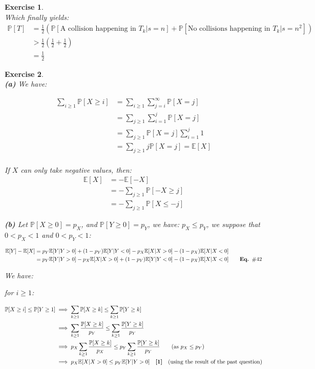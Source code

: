 \documentclass{article}
\newtheorem{exo}{Exercise}
\def\P{\mathbb{P}}
\def\E{\mathbb{E}}
\begin{document}
\begin{exo}{\ \\}
Which finally yields:
\begin{align*}
    \P[T] 
    &= \frac{1}{2} (\P[\text{A collision happening in $T_k$}|s=n] 
    + \P[\text{No collisions happening in $T_k$}|s=n^2]) \\
    &> \frac{1}{2}(\frac{1}{2} + \frac{1}{2} ) \\
    &= \frac{1}{2}
\end{align*}

\newpage
\end{exo}

\begin{exo}{\ \\}
\noindent    
\textbf{(a)} We have:

\begin{align*}
    \sum_{i\geq1} \P[X \geq i]
    &= \sum_{i\geq1} \sum_{j = i }^{\infty} \P[X=j] \\
    &= \sum_{j\geq1} \sum_{i=1}^{j} \P[X=j] \\
    &= \sum_{j\geq1} \P[X=j]\sum_{i=1}^{j}1  \\
    &= \sum_{j\geq1} j \P[X=j] = \E[X]\\
\end{align*}

If $X$ can only take negative values, then: 
\begin{align*}
    \E[X] 
    &= -\E[-X] \\
    &= -\sum_{j \geq 1} \P[-X \geq j] \\
    &= -\sum_{j \geq 1} \P[X \leq -j]
\end{align*}



\noindent    
\textbf{(b)} Let $\P[X\geq0] = p_X$, and $\P[Y\geq0] = p_Y$, we have: $p_X \leq p_Y$, we suppose that $0 < p_X < 1$ and $ 0 <  p_Y < 1$:

\begin{align*}
    \E[Y]-\E[X] 
    &= p_Y \E[Y|Y>0] + (1-p_Y)\E[Y|Y<0] -
    p_X \E[X|X>0] - (1-p_X)\E[X|X<0] \\
    &= p_Y \E[Y|Y>0] - p_X \E[X|X>0] 
    +(1-p_Y)\E[Y|Y<0] -  (1-p_X)\E[X|X<0] 
    \quad \quad \text{\textbf{Eq. $\#42$}}
\end{align*}

We have:


for $i \geq 1$:

\begin{align*}
    \P[X\geq i] \leq \P[Y \geq 1] 
    &\implies \sum_{k \geq 1} \P[X\geq k] \leq \sum_{k \geq 1} \P[Y \geq k]\\
    &\implies \sum_{k \geq 1} \frac{\P[X\geq k]}{p_Y}
    \leq \sum_{k \geq 1} \frac{\P[Y \geq k]}{p_Y}\\
    &\implies p_X \sum_{k \geq 1}  \frac{\P[X\geq k]}{p_X}
    \leq  p_Y \sum_{k \geq 1} \frac{\P[Y \geq k]}{p_Y} 
    \quad \quad \text{(as $p_X \leq p_Y$)}\\
    &\implies  p_X \E[X | X>0] \leq p_Y \E[Y | Y>0]
    \quad \text{\textbf{[1]}} \quad \text{(using the result of the past question)}  \\
\end{align*}


\end{exo}
\end{document}
